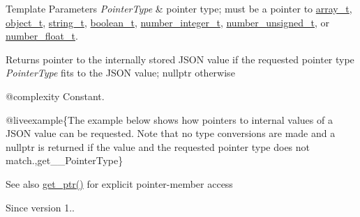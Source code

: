 \begin{DoxyTemplParams}{Template Parameters}
{\em Pointer\+Type} & pointer type; must be a pointer to \mbox{\hyperlink{classnlohmann_1_1basic__json_ae095578e03df97c5b3991787f1056374}{array\+\_\+t}}, \mbox{\hyperlink{classnlohmann_1_1basic__json_aa1eb13d5aa86f80cbee6c58e90fbaf49}{object\+\_\+t}}, \mbox{\hyperlink{classnlohmann_1_1basic__json_a61f8566a1a85a424c7266fb531dca005}{string\+\_\+t}}, \mbox{\hyperlink{classnlohmann_1_1basic__json_a4c919102a9b4fe0d588af64801436082}{boolean\+\_\+t}}, \mbox{\hyperlink{classnlohmann_1_1basic__json_a98e611d67b7bd75307de99c9358ab2dc}{number\+\_\+integer\+\_\+t}}, \mbox{\hyperlink{classnlohmann_1_1basic__json_ab906e29b5d83ac162e823ada2156b989}{number\+\_\+unsigned\+\_\+t}}, or \mbox{\hyperlink{classnlohmann_1_1basic__json_a88d6103cb3620410b35200ee8e313d97}{number\+\_\+float\+\_\+t}}.\\
\hline
\end{DoxyTemplParams}
\begin{DoxyReturn}{Returns}
pointer to the internally stored J\+S\+ON value if the requested pointer type {\itshape Pointer\+Type} fits to the J\+S\+ON value; {\ttfamily nullptr} otherwise
\end{DoxyReturn}
@complexity Constant.

@liveexample\{The example below shows how pointers to internal values of a J\+S\+ON value can be requested. Note that no type conversions are made and a {\ttfamily nullptr} is returned if the value and the requested pointer type does not match.,get\+\_\+\+\_\+\+Pointer\+Type\}

\begin{DoxySeeAlso}{See also}
\mbox{\hyperlink{classnlohmann_1_1basic__json_aefa46bd2d96bb77a38d1c8b431eab44f}{get\+\_\+ptr()}} for explicit pointer-\/member access
\end{DoxySeeAlso}
\begin{DoxySince}{Since}
version 1.. 
\end{DoxySince}
\mbox{\label{classnlohmann_1_1basic__json_a44a090c15a67b9f02e579b6e17ef0e1b}} 
